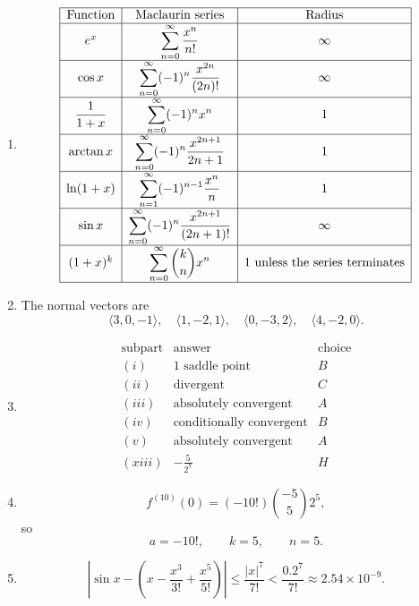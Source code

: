\documentclass[a4paper,12pt]{article}
\begin{document}
\begin{enumerate}[label=\textbf{\arabic*.},leftmargin=*]
\item
\[
\begin{array}{|c|c|c|}
\hline
\text{Function} & \text{Maclaurin series} & \text{Radius}\\
\hline
e^x & \displaystyle \sum_{n=0}^{\infty}\frac{x^n}{n!} & \infty\\
\hline
\cos x & \displaystyle \sum_{n=0}^{\infty}(-1)^n\frac{x^{2n}}{(2n)!} & \infty\\
\hline
\dfrac{1}{1+x} & \displaystyle \sum_{n=0}^{\infty}(-1)^n x^n & 1\\
\hline
\arctan x & \displaystyle \sum_{n=0}^{\infty}(-1)^n\frac{x^{2n+1}}{2n+1} & 1\\
\hline
\ln(1+x) & \displaystyle \sum_{n=1}^{\infty}(-1)^{n-1}\frac{x^n}{n} & 1\\
\hline
\sin x & \displaystyle \sum_{n=0}^{\infty}(-1)^n\frac{x^{2n+1}}{(2n+1)!} & \infty\\
\hline
(1+x)^k & \displaystyle \sum_{n=0}^{\infty}\binom{k}{n}x^n & 1\text{ unless the series terminates}\\
\hline
\end{array}
\]

\item The normal vectors are
\[
  \boxed{\langle3,0,-1\rangle,\quad
  \langle1,-2,1\rangle,\quad
  \langle0,-3,2\rangle,\quad
  \langle4,-2,0\rangle}.
\]

\item
\[
\begin{array}{c|c|c}
\text{subpart} & \text{answer} & \text{choice}\\
\hline
(i) & 1\text{ saddle point} & B\\
(ii) & \text{divergent} & C\\
(iii) & \text{absolutely convergent} & A\\
(iv) & \text{conditionally convergent} & B\\
(v) & \text{absolutely convergent} & A\\
(xiii) & \displaystyle -\frac{5}{2^7} & H
\end{array}
\]

\item
\[
  f^{(10)}(0)=(-10!)\binom{-5}{5}2^5,
\]
so
\[
  \boxed{a=-10!},\qquad \boxed{k=5},\qquad \boxed{n=5}.
\]

\item
\[
  \left|\sin x-\left(x-\frac{x^3}{3!}+\frac{x^5}{5!}\right)\right|
  \le\frac{|x|^7}{7!}
  <\boxed{\frac{0.2^7}{7!}\approx2.54\times10^{-9}}.
\]


\end{enumerate}
\end{document}
